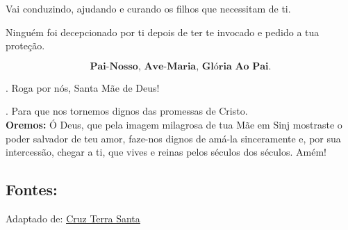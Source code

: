 \documentclass[a4paper,14pt]{extarticle} \usepackage[utf8]{inputenc}
\makeatletter
\newcommand{\vers@resp@sym}{%
  \raisebox{0.2ex}{\rotatebox[origin=c]{-20}{$\m@th\rceil$}}%
}
\newcommand{\vers@resp}[2]{%
  {\ooalign{%
     \hidewidth\kern#1\vers@resp@sym\hidewidth\cr
     #2\cr
  }}%
}
\DeclareRobustCommand{\versicle}{\vers@resp{-0.1em}{V}}
\DeclareRobustCommand{\response}{\vers@resp{0pt}{R}}
\makeatother
\begin{document}
Vai conduzindo, ajudando e curando os filhos que necessitam de ti.

Ninguém foi decepcionado por ti depois de ter te invocado e pedido a tua proteção.

\newpage

\[
  \textbf{Pai-Nosso, Ave-Maria, Glória Ao Pai.}
\]

\response. \quad Roga por nós, Santa Mãe de Deus!

\versicle. \quad Para que nos tornemos dignos das promessas de Cristo. \\

\textbf{Oremos:} Ó Deus, que pela imagem milagrosa de tua Mãe em Sinj mostraste o poder salvador de teu amor, faze-nos dignos de amá-la sinceramente e, por sua intercessão, chegar a ti, que vives e reinas pelos séculos dos séculos. Amém!


\vfill

\begin{center}
\subsection*{Fontes:}
Adaptado de: \underline{\href{https://www.miliciadaimaculada.org.br/espiritualidade/nossa-senhora/novena-maria-passa-na-frente}{Cruz Terra Santa}}
\end{center}
\end{document}
